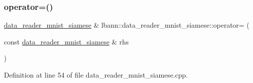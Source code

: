 \mbox{\label{classlbann_1_1data__reader__mnist__siamese_ad41517c9c789bbf8d7e0696832e52d98}} 
\subsubsection{\texorpdfstring{operator=()}{operator=()}}
{\footnotesize\ttfamily \hyperlink{classlbann_1_1data__reader__mnist__siamese}{data\+\_\+reader\+\_\+mnist\+\_\+siamese} \& lbann\+::data\+\_\+reader\+\_\+mnist\+\_\+siamese\+::operator= (\begin{DoxyParamCaption}\item[{const \hyperlink{classlbann_1_1data__reader__mnist__siamese}{data\+\_\+reader\+\_\+mnist\+\_\+siamese} \&}]{rhs }\end{DoxyParamCaption})}



Definition at line 54 of file data\+\_\+reader\+\_\+mnist\+\_\+siamese.\+cpp.


